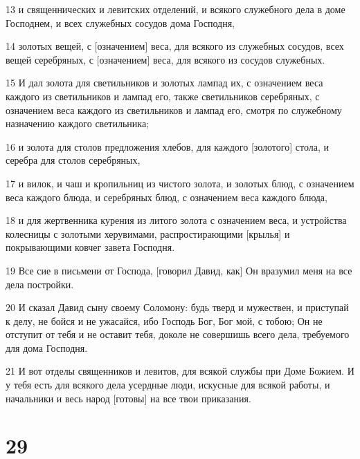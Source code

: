 \par 13 и священнических и левитских отделений, и всякого служебного дела в доме Господнем, и всех служебных сосудов дома Господня,
\par 14 золотых вещей, с [означением] веса, для всякого из служебных сосудов, всех вещей серебряных, с [означением] веса, для всякого из сосудов служебных.
\par 15 И дал золота для светильников и золотых лампад их, с означением веса каждого из светильников и лампад его, также светильников серебряных, с означением веса каждого из светильников и лампад его, смотря по служебному назначению каждого светильника;
\par 16 и золота для столов предложения хлебов, для каждого [золотого] стола, и серебра для столов серебряных,
\par 17 и вилок, и чаш и кропильниц из чистого золота, и золотых блюд, с означением веса каждого блюда, и серебряных блюд, с означением веса каждого блюда,
\par 18 и для жертвенника курения из литого золота с означением веса, и устройства колесницы с золотыми херувимами, распростирающими [крылья] и покрывающими ковчег завета Господня.
\par 19 Все сие в письмени от Господа, [говорил Давид, как] Он вразумил меня на все дела постройки.
\par 20 И сказал Давид сыну своему Соломону: будь тверд и мужествен, и приступай к делу, не бойся и не ужасайся, ибо Господь Бог, Бог мой, с тобою; Он не отступит от тебя и не оставит тебя, доколе не совершишь всего дела, требуемого для дома Господня.
\par 21 И вот отделы священников и левитов, для всякой службы при Доме Божием. И у тебя есть для всякого дела усердные люди, искусные для всякой работы, и начальники и весь народ [готовы] на все твои приказания.

\chapter{29}

